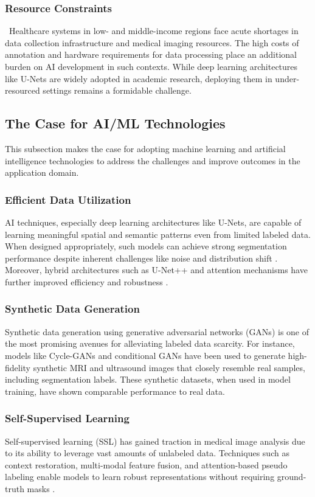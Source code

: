 \documentclass{article}
\begin{document}
\subsubsection{Resource Constraints}\
Healthcare systems in low- and middle-income regions face acute shortages in data collection infrastructure and medical imaging resources. The high costs of annotation and hardware requirements for data processing place an additional burden on AI development in such contexts. While deep learning architectures like U-Nets are widely adopted in academic research, deploying them in under-resourced settings remains a formidable challenge​.

\subsection{The Case for AI/ML Technologies}
This subsection makes the case for adopting machine learning and artificial intelligence technologies to address the challenges and improve outcomes in the application domain.

\subsubsection{Efficient Data Utilization}
AI techniques, especially deep learning architectures like U-Nets, are capable of learning meaningful spatial and semantic patterns even from limited labeled data. When designed appropriately, such models can achieve strong segmentation performance despite inherent challenges like noise and distribution shift​
\cite{vermaRoleDeepLearning2023}. Moreover, hybrid architectures such as U-Net++ and attention mechanisms have further improved efficiency and robustness​
\cite{zhouUNetNestedUNet2018}.

\subsubsection{Synthetic Data Generation}
Synthetic data generation using generative adversarial networks (GANs) is one of the most promising avenues for alleviating labeled data scarcity. For instance, models like Cycle-GANs and conditional GANs have been used to generate high-fidelity synthetic MRI and ultrasound images that closely resemble real samples, including segmentation labels. These synthetic datasets, when used in model training, have shown comparable performance to real data\cite{9324763,shinMedicalImageSynthesis2018}​.

\subsubsection{Self-Supervised Learning}
Self-supervised learning (SSL) has gained traction in medical image analysis due to its ability to leverage vast amounts of unlabeled data. Techniques such as context restoration, multi-modal feature fusion, and attention-based pseudo labeling enable models to learn robust representations without requiring ground-truth masks​
​\cite{CHAITANYA2021101934,zhengHierarchicalSelfsupervisedLearning2021}.
\end{document}
